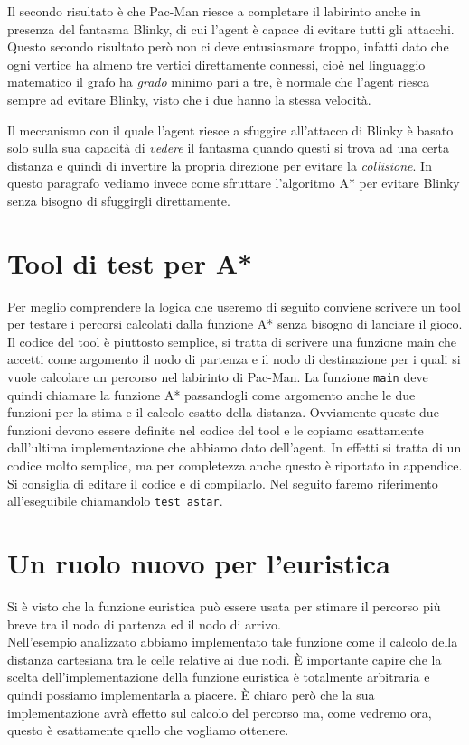 \documentclass[8pt]{book}
\begin{document}
Il secondo risultato è che Pac-Man riesce a completare il labirinto anche in presenza del fantasma Blinky, di cui l'agent è capace di evitare tutti gli attacchi. Questo secondo risultato però non ci deve entusiasmare troppo, infatti dato che ogni vertice ha almeno tre vertici direttamente connessi, cioè nel linguaggio matematico il grafo ha \emph{grado} minimo pari a tre, è normale che l'agent riesca sempre ad evitare Blinky, visto che i due hanno la stessa velocità.

Il meccanismo con il quale l'agent riesce a sfuggire all'attacco di Blinky è basato solo sulla sua capacità di \emph{vedere} il fantasma quando questi si trova ad una certa distanza e quindi di invertire la propria direzione per evitare la \emph{collisione}. In questo paragrafo vediamo invece come sfruttare l'algoritmo A* per evitare Blinky senza bisogno di sfuggirgli direttamente.

\section{Tool di test per A*}

Per meglio comprendere la logica che useremo di seguito conviene scrivere un tool per testare i percorsi calcolati dalla funzione A* senza bisogno di lanciare il gioco. Il codice del tool è piuttosto semplice, si tratta di scrivere una funzione main che accetti come argomento il nodo di partenza e il nodo di destinazione per i quali si vuole calcolare un percorso nel labirinto di Pac-Man. La funzione \texttt{main} deve quindi chiamare la funzione A* passandogli come argomento anche le due funzioni per la stima e il calcolo esatto della distanza. Ovviamente queste due funzioni devono essere definite nel codice del tool e le copiamo esattamente dall'ultima implementazione che abbiamo dato dell'agent. In effetti si tratta di un codice molto semplice, ma per completezza anche questo è riportato in appendice. Si consiglia di editare il codice e di compilarlo. Nel seguito faremo riferimento all'eseguibile chiamandolo \texttt{test\_astar}.

\section{Un ruolo nuovo per l'euristica}

Si è visto che la funzione euristica può essere usata per stimare il percorso più breve tra il nodo di partenza ed il nodo di arrivo.\\
Nell'esempio analizzato abbiamo implementato tale funzione come il calcolo della distanza cartesiana tra le celle relative ai due nodi. È importante capire che la scelta dell'implementazione della funzione euristica è totalmente arbitraria e quindi possiamo implementarla a piacere. È chiaro però che la sua implementazione avrà effetto sul calcolo del percorso ma, come vedremo ora, questo è esattamente quello che vogliamo ottenere.
\end{document}
